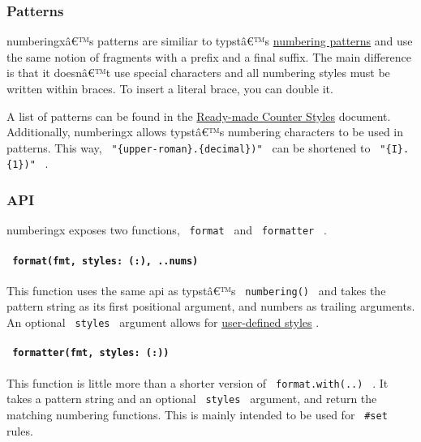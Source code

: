 \subsubsection{Patterns}\label{patterns}

numberingxâ€™s patterns are similiar to typstâ€™s
\href{https://typst.app/docs/reference/meta/numbering/}{numbering
patterns} and use the same notion of fragments with a prefix and a final
suffix. The main difference is that it doesnâ€™t use special characters
and all numbering styles must be written within braces. To insert a
literal brace, you can double it.

A list of patterns can be found in the
\href{https://www.w3.org/TR/predefined-counter-styles/}{Ready-made
Counter Styles} document. Additionally, numberingx allows typstâ€™s
numbering characters to be used in patterns. This way,
\texttt{\ "\{upper-roman\}.\{decimal\})"\ } can be shortened to
\texttt{\ "\{I\}.\{1\})"\ } .

\subsubsection{API}\label{api}

numberingx exposes two functions, \texttt{\ format\ } and
\texttt{\ formatter\ } .

\paragraph{\texorpdfstring{\texttt{\ format(fmt,\ styles:\ (:),\ ..nums)\ }}{ format(fmt, styles: (:), ..nums) }}\label{formatfmt-styles-..nums}

This function uses the same api as typstâ€™s \texttt{\ numbering()\ }
and takes the pattern string as its first positional argument, and
numbers as trailing arguments. An optional \texttt{\ styles\ } argument
allows for
\href{https://github.com/typst/packages/raw/main/packages/preview/numberingx/0.0.1/\#user-defined-styles}{user-defined
styles} .

\paragraph{\texorpdfstring{\texttt{\ formatter(fmt,\ styles:\ (:))\ }}{ formatter(fmt, styles: (:)) }}\label{formatterfmt-styles}

This function is little more than a shorter version of
\texttt{\ format.with(..)\ } . It takes a pattern string and an optional
\texttt{\ styles\ } argument, and return the matching numbering
functions. This is mainly intended to be used for \texttt{\ \#set\ }
rules.

